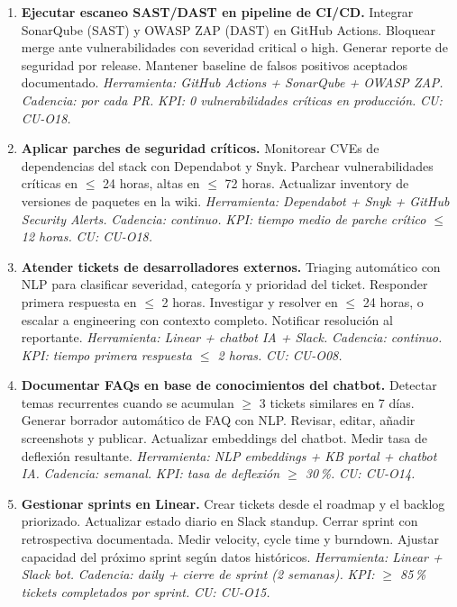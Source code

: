 ﻿\documentclass[11pt, letterpaper]{article}
\begin{document}
\begin{enumerate}[leftmargin=1.5cm, label=\textbf{OP\arabic*}, itemsep=2pt, topsep=4pt]
    \item \textbf{Ejecutar escaneo SAST/DAST en pipeline de CI/CD.} Integrar SonarQube (SAST) y OWASP ZAP (DAST) en GitHub Actions. Bloquear merge ante vulnerabilidades con severidad critical o high. Generar reporte de seguridad por release. Mantener baseline de falsos positivos aceptados documentado. \textit{Herramienta: GitHub Actions + SonarQube + OWASP ZAP.} \textit{Cadencia: por cada PR.} \textit{KPI: 0 vulnerabilidades críticas en producción.} \textit{CU: CU-O18.}



    \item \textbf{Aplicar parches de seguridad críticos.} Monitorear CVEs de dependencias del stack con Dependabot y Snyk. Parchear vulnerabilidades críticas en $\leq$ 24 horas, altas en $\leq$ 72 horas. Actualizar inventory de versiones de paquetes en la wiki. \textit{Herramienta: Dependabot + Snyk + GitHub Security Alerts.} \textit{Cadencia: continuo.} \textit{KPI: tiempo medio de parche crítico $\leq$ 12 horas.} \textit{CU: CU-O18.}



    \item \textbf{Atender tickets de desarrolladores externos.} Triaging automático con NLP para clasificar severidad, categoría y prioridad del ticket. Responder primera respuesta en $\leq$ 2 horas. Investigar y resolver en $\leq$ 24 horas, o escalar a engineering con contexto completo. Notificar resolución al reportante. \textit{Herramienta: Linear + chatbot IA + Slack.} \textit{Cadencia: continuo.} \textit{KPI: tiempo primera respuesta $\leq$ 2 horas.} \textit{CU: CU-O08.}



    \item \textbf{Documentar FAQs en base de conocimientos del chatbot.} Detectar temas recurrentes cuando se acumulan $\geq$ 3 tickets similares en 7 días. Generar borrador automático de FAQ con NLP. Revisar, editar, añadir screenshots y publicar. Actualizar embeddings del chatbot. Medir tasa de deflexión resultante. \textit{Herramienta: NLP embeddings + KB portal + chatbot IA.} \textit{Cadencia: semanal.} \textit{KPI: tasa de deflexión $\geq$ 30\,\%.} \textit{CU: CU-O14.}



    \item \textbf{Gestionar sprints en Linear.} Crear tickets desde el roadmap y el backlog priorizado. Actualizar estado diario en Slack standup. Cerrar sprint con retrospectiva documentada. Medir velocity, cycle time y burndown. Ajustar capacidad del próximo sprint según datos históricos. \textit{Herramienta: Linear + Slack bot.} \textit{Cadencia: daily + cierre de sprint (2 semanas).} \textit{KPI: $\geq$ 85\,\% tickets completados por sprint.} \textit{CU: CU-O15.}




\end{enumerate}
\end{document}
